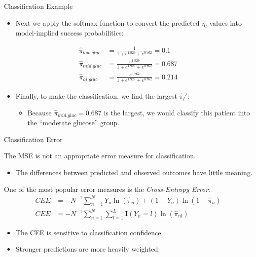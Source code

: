 \documentclass{beamer}\usepackage[]{graphicx}\usepackage[]{color}
\begin{document}
\begin{frame}{Classification Example}
\begin{itemize}
\item Next we apply the softmax function to convert the predicted $\eta_l$ 
  values into model-implied success probabilities:
\end{itemize}
\begin{align*}
  \hat{\pi}_{low.gluc} &=  
  \frac{1}{1 + e^{1.929} + e^{0.762}} = 
  0.1\\[8pt]
  \hat{\pi}_{mid.gluc} &= 
  \frac{e^{1.929}}{1 + e^{1.929} + e^{0.762}} = 
  0.687\\[8pt]
  \hat{\pi}_{hi.gluc} &= 
  \frac{e^{0.762}}{1 + e^{1.929} + e^{0.762}} =
  0.214  
\end{align*}
\begin{itemize}
\item Finally, to make the classification, we find the largest $\hat{\pi}_l'$:
  \begin{itemize}
  \item Because $\hat{\pi}_{mid.gluc} = 0.687$ is the 
    largest, we would classify this patient into the 
    ``moderate glucose'' group.
  \end{itemize}
\end{itemize}

\end{frame}


\begin{frame}{Classification Error}
  
  The MSE is not an appropriate error measure for classification.
  \begin{itemize}
  \item The differences between predicted and observed outcomes have little
    meaning.
  \end{itemize}
  \vb
  One of the most popular error measures is the \emph{Cross-Entropy Error}:
  \begin{align*}
    CEE &= -N^{-1} \sum_{n = 1}^N Y_n \ln(\hat{\pi}_n) + (1 - Y_n)\ln(1 - \hat{\pi}_n)\\
    CEE &= -N^{-1} \sum_{n = 1}^N \sum_{l = 1}^L \textbf{I}(Y_n = l) \ln(\hat{\pi}_{nl})
  \end{align*}
  \begin{itemize}
  \item The CEE is sensitive to classification confidence.
  \item Stronger predictions are more heavily weighted.
  \end{itemize}
  
\end{frame}
\end{document}
